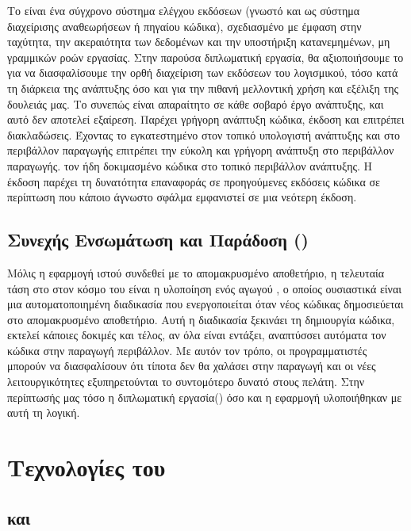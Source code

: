 Το  είναι ένα σύγχρονο σύστημα ελέγχου εκδόσεων (γνωστό και ως σύστημα διαχείρισης αναθεωρήσεων ή πηγαίου κώδικα), 
σχεδιασμένο με έμφαση στην ταχύτητα, την ακεραιότητα των δεδομένων και την υποστήριξη κατανεμημένων, μη γραμμικών ροών εργασίας. 
Στην παρούσα διπλωματική εργασία, θα αξιοποιήσουμε το  για να διασφαλίσουμε την ορθή διαχείριση των εκδόσεων του λογισμικού, 
τόσο κατά τη διάρκεια της ανάπτυξης όσο και για την πιθανή μελλοντική χρήση και εξέλιξη της δουλειάς μας. Το  συνεπώς είναι απαραίτητο σε κάθε σοβαρό 
έργο ανάπτυξης, και αυτό δεν αποτελεί εξαίρεση. Παρέχει γρήγορη ανάπτυξη κώδικα, έκδοση και επιτρέπει διακλαδώσεις. Έχοντας το εγκατεστημένο στον 
τοπικό υπολογιστή ανάπτυξης και στο περιβάλλον παραγωγής επιτρέπει την εύκολη και γρήγορη ανάπτυξη στο περιβάλλον παραγωγής.
τον ήδη δοκιμασμένο κώδικα στο τοπικό περιβάλλον ανάπτυξης. Η έκδοση παρέχει τη δυνατότητα επαναφοράς σε προηγούμενες εκδόσεις κώδικα σε
περίπτωση που κάποιο άγνωστο σφάλμα εμφανιστεί σε μια νεότερη έκδοση. 

\subsection{Συνεχής Ενσωμάτωση και Παράδοση () }

Μόλις η εφαρμογή ιστού συνδεθεί με το απομακρυσμένο αποθετήριο, η τελευταία τάση στο
στον κόσμο του  είναι η υλοποίηση ενός αγωγού , ο οποίος ουσιαστικά
είναι μια αυτοματοποιημένη διαδικασία που ενεργοποιείται όταν νέος κώδικας δημοσιεύεται στο
απομακρυσμένο αποθετήριο. Αυτή η διαδικασία ξεκινάει τη δημιουργία κώδικα, εκτελεί κάποιες δοκιμές και
τέλος, αν όλα είναι εντάξει, αναπτύσσει αυτόματα τον κώδικα στην παραγωγή
περιβάλλον. Με αυτόν τον τρόπο, οι προγραμματιστές μπορούν να διασφαλίσουν ότι τίποτα δεν θα χαλάσει
στην παραγωγή και οι νέες λειτουργικότητες εξυπηρετούνται το συντομότερο δυνατό στους
πελάτη. Στην περίπτωσής μας τόσο η διπλωματική εργασία() όσο και η εφαρμογή υλοποιήθηκαν με αυτή τη λογική.


\section{Τεχνολογίες του }

\subsection{ και }

